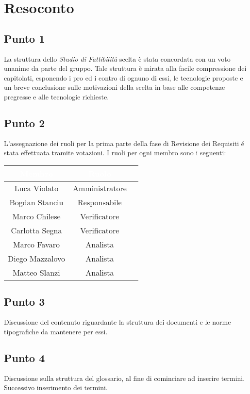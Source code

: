\section{Resoconto}

\subsection{Punto 1}

La struttura dello \textit{Studio di Fattibilità} scelta è stata concordata con un voto unanime da parte del gruppo. Tale struttura è mirata alla facile compressione dei capitolati, esponendo i pro ed i contro di ognuno di essi, le tecnologie proposte e un breve conclusione sulle motivazioni della scelta in base alle competenze pregresse e alle tecnologie richieste.  


\subsection{Punto 2}
L'assegnazione dei ruoli per la prima parte della fase di Revisione dei Requisiti \'e stata effettuata tramite votazioni. I ruoli per ogni membro sono i seguenti:

\begin{center}
\begin{tabular}{|c|c|c|}
\hline
\rowcolor{bluelogo}\textbf{\textcolor{white}{Membro}} & \textbf{\textcolor{white}{Ruolo}} \\
\hline
Luca Violato & Amministratore\\
\hline
\rowcolor{grigio}Bogdan Stanciu &  Responsabile\\
\hline
Marco Chilese & Verificatore \\
\hline
\rowcolor{grigio} Carlotta Segna & Verificatore \\
\hline
Marco Favaro & Analista\\
\hline
\rowcolor{grigio} Diego Mazzalovo & Analista\\
\hline
Matteo Slanzi & Analista \\
\hline
\end{tabular}
\end{center}


\subsection{Punto 3}
Discussione del contenuto riguardante la struttura dei documenti e le norme tipografiche da mantenere per essi.

\subsection{Punto 4}
Discussione sulla struttura del glossario, al fine di cominciare ad inserire termini. Successivo inserimento dei termini.

